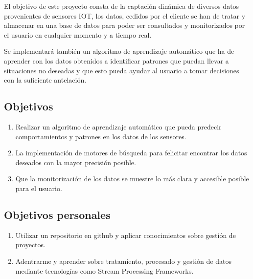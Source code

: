 
El objetivo de este proyecto consta de la captación dinámica de diversos datos provenientes de sensores IOT, los datos, cedidos por el cliente se han de tratar y almacenar en una base de datos para poder ser consultados y monitorizados por el usuario en cualquier momento y a tiempo real. 

Se implementará también un algoritmo de aprendizaje automático que ha de aprender con los datos obtenidos a identificar patrones que puedan llevar a situaciones no deseadas y que esto pueda ayudar al usuario a tomar decisiones con la suficiente antelación.

\subsection{Objetivos}

\begin{enumerate}
    \item Realizar un algoritmo de aprendizaje automático que pueda predecir comportamientos y patrones en los datos de los sensores.
    \item La implementación de motores de búsqueda para felicitar encontrar los datos deseados con la mayor precisión posible.
    \item Que la monitorización de los datos se muestre lo más clara y accesible posible para el usuario.
\end{enumerate}


\subsection{Objetivos personales}

\begin{enumerate}
    \item Utilizar un repositorio en github y aplicar conocimientos sobre gestión de proyectos.
    \item Adentrarme y aprender sobre tratamiento, procesado y gestión de datos mediante tecnologías como Stream Processing Frameworks.
\end{enumerate}
